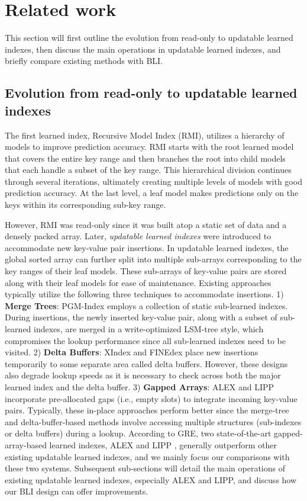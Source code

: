 \section{Related work \label{sec-realted-work}
}
This section will first outline the evolution from read-only to updatable learned indexes, then discuss the main operations in updatable learned indexes, and briefly compare existing methods with BLI.

\subsection{Evolution from read-only to updatable learned indexes}
The first learned index, Recursive Model Index (RMI)\cite{kraska2018case}, utilizes a hierarchy of models to improve prediction accuracy. RMI starts with the root learned model that covers the entire key range and then branches the root into child models that each handle a subset of the key range. This hierarchical division continues through several iterations, ultimately creating multiple levels of models with good prediction accuracy. At the last level, a leaf model makes predictions only on the keys within its corresponding sub-key range.

However, RMI was read-only since it was built atop a static set of data and a densely packed array. Later, \textit{updatable learned indexes} were introduced to accommodate new key-value pair insertions. In updatable learned indexes, the global sorted array can further split into multiple sub-arrays corresponding to the key ranges of their leaf models. These sub-arrays of key-value pairs are stored along with their leaf models for ease of maintenance. Existing approaches typically utilize the following three techniques \cite{wongkham2022updatable} to accommodate insertions. 1) \textbf{Merge Trees}: PGM-Index\cite{ferragina2020pgm} employs a collection of static sub-learned indexes. During insertions, the newly inserted key-value pair, along with a subset of sub-learned indexes, are merged in a write-optimized LSM-tree style, which compromises the lookup performance since all sub-learned indexes need to be visited. 2) \textbf{Delta Buffers}: XIndex\cite{tang2020xindex} and FINEdex\cite{li2021finedex} place new insertions temporarily to some separate area called delta buffers. However, these designs also degrade lookup speeds as it is necessary to check across both the major learned index and the delta buffer. 3) \textbf{Gapped Arrays}: ALEX\cite{ding2020alex} and LIPP\cite{wu2021updatable} incorporate pre-allocated gaps (i.e., empty slots) to integrate incoming key-value pairs. Typically, these in-place approaches perform better since the merge-tree and delta-buffer-based methods involve accessing multiple structures (sub-indexes or delta buffers) during a lookup. According to GRE, two state-of-the-art gapped-array-based learned indexes, ALEX \cite{ding2020alex} and LIPP \cite{wu2021updatable}, generally outperform other existing updatable learned indexes, and we mainly focus our comparisons with these two systems. Subsequent sub-sections will detail the main operations of existing updatable learned indexes, especially ALEX and LIPP, and discuss how our BLI design can offer improvements.

